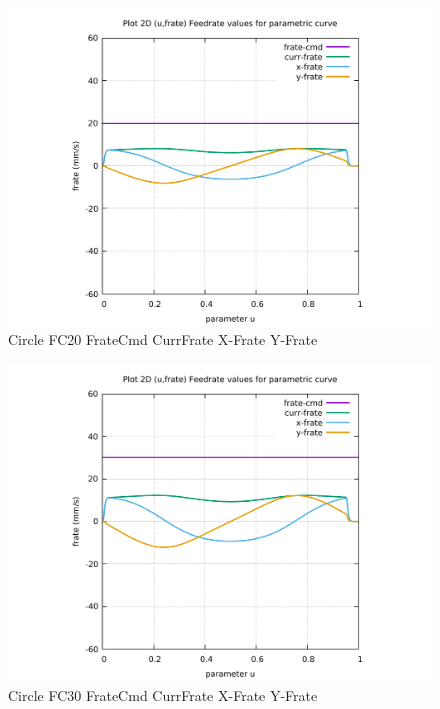 \begin{figure}
	\caption     {Circle FC20 FrateCmd CurrFrate X-Frate Y-Frate}
	\label{28-img-Circle-FC20-FrateCmd-CurrFrate-X-Frate-Y-Frate.pdf}
	\includegraphics[width=1.00\textwidth]{Chap4/appendix/app-Circle/plots/28-img-Circle-FC20-FrateCmd-CurrFrate-X-Frate-Y-Frate.pdf}
\end{figure}


\clearpage
\pagebreak

\begin{figure}
	\caption     {Circle FC30 FrateCmd CurrFrate X-Frate Y-Frate}
	\label{29-img-Circle-FC30-FrateCmd-CurrFrate-X-Frate-Y-Frate.pdf}
	\includegraphics[width=1.00\textwidth]{Chap4/appendix/app-Circle/plots/29-img-Circle-FC30-FrateCmd-CurrFrate-X-Frate-Y-Frate.pdf}
\end{figure}



